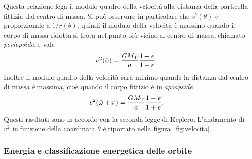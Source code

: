 Questa relazione lega il modulo quadro della velocità alla distanza della
particella fittizia dal centro di massa. Si può osservare in particolare che
$v^2(\theta)$ è proporzionale a $1/r(\theta)$, quindi il modulo della velocità è
massimo quando il corpo di massa ridotta si trova nel punto più vicino al centro
di massa, chiamato \emph{periapside}, e vale %
\begin{equation}
  v^2(\tilde\omega) = \frac{GM_\textup{T}}{a}\frac{1+e}{1-e}.
\end{equation}
Inoltre il modulo quadro della velocità sarà minimo quando la distanza dal
centro di massa è massima, cioè quando il corpo fittizio è in \emph{apoapside}
\begin{equation}
  v^2(\tilde\omega+\pi) = \frac{GM_\textup{T}}{a}\frac{1-e}{1+e}.
\end{equation}
Questi risultati sono in accordo con la seconda legge di Keplero. L'andamento di
$v^2$ in funzione della coordinata $\theta$ è riportato nella
figura~\ref{fig:velocita}.

\subsubsection{Energia e classificazione energetica delle orbite}
\label{sec:energ-class}

